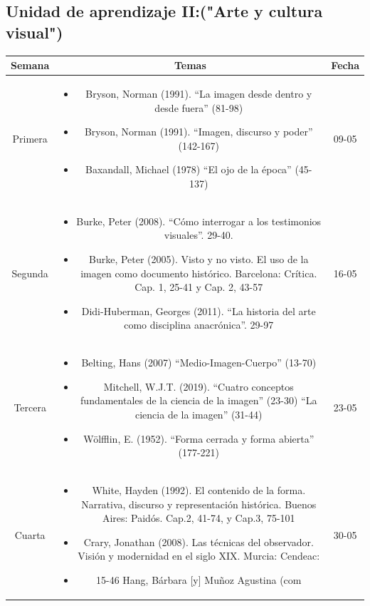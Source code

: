 \documentclass[a4paper]{article}
\begin{document}
\subsection{Unidad de aprendizaje II:("Arte y cultura visual")}
\begin{table}[ht]
\centering
\begin{tabular}{|c|c|c|}
\hline
\textbf{Semana} & \textbf{Temas} & \textbf{Fecha} \\ 
\hline
Primera 
& \begin{minipage}[t]{10cm}
\begin{itemize}
\item Bryson, Norman (1991). “La imagen desde dentro y desde fuera” (81-98)
\item Bryson, Norman (1991). “Imagen, discurso y poder” (142-167)
\item Baxandall, Michael (1978) “El ojo de la época” (45-137)
\end{itemize}
\end{minipage} & 09-05\\ 
\hline 
Segunda 
& \begin{minipage}[t]{10cm}
\begin{itemize}
\item Burke, Peter (2008). “Cómo interrogar a los testimonios visuales”. 29-40.
\item Burke, Peter (2005). Visto y no visto. El uso de la imagen como documento histórico. Barcelona: Crítica. Cap. 1, 25-41 y Cap. 2, 43-57
\item Didi-Huberman, Georges (2011). “La historia del arte como disciplina anacrónica”. 29-97
\end{itemize}
\end{minipage} & 16-05\\ 
\hline 
Tercera 
& \begin{minipage}[t]{10cm}
\begin{itemize}
\item Belting, Hans (2007) “Medio-Imagen-Cuerpo” (13-70)
\item Mitchell, W.J.T. (2019). “Cuatro conceptos fundamentales de la ciencia de la imagen” (23-30) “La ciencia de la imagen” (31-44)
\item Wölfflin, E. (1952). “Forma cerrada y forma abierta” (177-221)
\end{itemize}
\end{minipage} & 23-05 \\ 
\hline 
Cuarta 
& \begin{minipage}[t]{10cm}
\begin{itemize}
\item White, Hayden (1992). El contenido de la forma. Narrativa, discurso y representación histórica. Buenos Aires: Paidós. Cap.2, 41-74, y Cap.3, 75-101
\item Crary, Jonathan (2008). Las técnicas del observador. Visión y modernidad en el siglo XIX. Murcia: Cendeac:
\item 15-46 Hang, Bárbara [y] Muñoz Agustina (com
\end{itemize}
\end{minipage} & 30-05 \\ 
\hline 
\end{tabular}
\end{table}
\newpage
\end{document}
